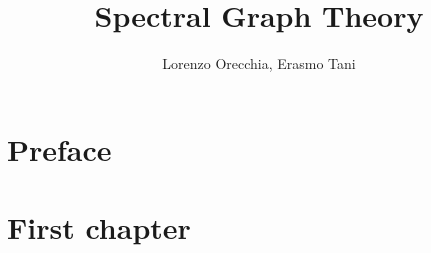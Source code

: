 \documentclass[12pt]{book}
\title{Spectral Graph Theory}
\author{Lorenzo Orecchia, Erasmo Tani}
\begin{document}
\iffalse
This is one traditional page order for books.

Frontmatter

   - Half-title
   - Empty
   - Title page
   - Information (copyright notice, ISBN, etc.)
   - Dedication if any, else empty
   - Table of contents
   - List of figures (can be in the backmatter too)
   - Preface chapter

Mainmatter

   - Main topic

Appendix

    - Some subordinate chapters

Backmatter

    - Bibliography
    - Glossary / Index


 Chapters after the frontmatter are not numbered
 Page numbers will be printed in roman numerals.
 Frontmatter is not supposed to have sections, so they will be numbered 0.n because there is no chapter numbering.

\fi

\frontmatter

\maketitle

\chapter{Preface}



\iffalse

  The mainmatter chapters works as usual. The command resets the page numbering.
  Page numbers will be printed in arabic numerals.

\fi

\mainmatter
\chapter{First chapter}







\end{document}
